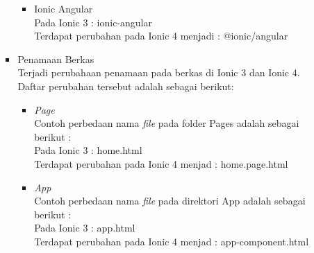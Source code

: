 \begin{enumerate}
\begin{enumerate}
\begin{itemize}
\begin{itemize}
				\item Ionic Angular \\
				Pada Ionic 3 : ionic-angular  \\
				Terdapat perubahan pada Ionic 4 menjadi : @ionic/angular
			\end{itemize}
	
			
	


	

			\item Penamaan Berkas \\
			Terjadi perubahaan penamaan pada berkas di Ionic 3 dan Ionic 4. Daftar perubahan tersebut adalah sebagai berikut:
			\begin{itemize}
				\item {\it Page} \\
				Contoh perbedaan nama {\it file} pada folder Pages adalah sebagai berikut :\\
				Pada Ionic 3 : home.html  \\
				Terdapat perubahan pada Ionic 4 menjad : home.page.html
	
				\item {\it App} \\
				Contoh perbedaan nama {\it file} pada direktori App adalah sebagai berikut : \\
				Pada Ionic 3 : app.html \\
				Terdapat perubahan pada Ionic 4 menjad : app-component.html
			\end{itemize}



\end{itemize}
\end{enumerate}
\end{enumerate}
